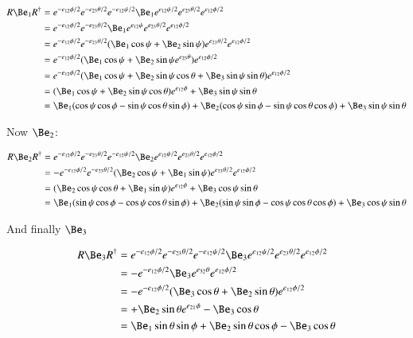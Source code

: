 \documentclass{article}      %
\begin{document}
\begin{align*}
R \Be_1 R^\dagger
&= 
e^{-e_{12}\phi/2} e^{-e_{23}\theta/2} e^{-e_{12}\psi/2}
\Be_1
e^{e_{12}\psi/2}
e^{e_{23}\theta/2} 
e^{e_{12}\phi/2} \\
&= 
e^{-e_{12}\phi/2} e^{-e_{23}\theta/2} 
\Be_1 e^{e_{12}\psi}
e^{e_{23}\theta/2} 
e^{e_{12}\phi/2} \\
&= 
e^{-e_{12}\phi/2} e^{-e_{23}\theta/2} 
(\Be_1 \cos\psi + \Be_2 \sin\psi)
e^{e_{23}\theta/2} 
e^{e_{12}\phi/2} \\
&= 
e^{-e_{12}\phi/2} 
(\Be_1 \cos\psi + \Be_2 \sin\psi e^{e_{23}\theta} )
e^{e_{12}\phi/2} \\
&= 
e^{-e_{12}\phi/2} 
(\Be_1 \cos\psi + \Be_2 \sin\psi \cos\theta + \Be_3 \sin\psi \sin\theta )
e^{e_{12}\phi/2} \\
&= 
(\Be_1 \cos\psi + \Be_2 \sin\psi \cos\theta ) e^{e_{12}\phi} 
+ \Be_3 \sin\psi \sin\theta  \\
&= 
  \Be_1 (\cos\psi \cos\phi - \sin\psi \cos\theta \sin\phi)
+ \Be_2 (\cos\psi \sin\phi - \sin\psi \cos\theta \cos\phi)
+ \Be_3 \sin\psi \sin\theta  \\
\end{align*}

Now $\Be_2$:

\begin{align*}
R \Be_2 R^\dagger
&= 
e^{-e_{12}\phi/2} e^{-e_{23}\theta/2} e^{-e_{12}\psi/2}
\Be_2
e^{e_{12}\psi/2}
e^{e_{23}\theta/2} 
e^{e_{12}\phi/2} \\
&= 
-e^{-e_{12}\phi/2} e^{-e_{23}\theta/2} 
(\Be_2 \cos\psi + \Be_1 \sin\psi)
e^{e_{23}\theta/2} 
e^{e_{12}\phi/2} \\
&= 
(\Be_2 \cos\psi \cos\theta
+ \Be_1 \sin\psi)
e^{e_{12}\phi} 
+\Be_3 \cos\psi \sin\theta \\
&= 
  \Be_1 (\sin\psi \cos\phi - \cos\psi \cos\theta \sin\phi)
+ \Be_2 (\sin\psi \sin\phi - \cos\psi \cos\theta \cos\phi)
+ \Be_3 \cos\psi \sin\theta \\
\end{align*}

And finally $\Be_3$

\begin{align*}
R \Be_3 R^\dagger
&= 
e^{-e_{12}\phi/2} e^{-e_{23}\theta/2} e^{-e_{12}\psi/2}
\Be_3
e^{e_{12}\psi/2}
e^{e_{23}\theta/2} 
e^{e_{12}\phi/2} \\
&= 
-e^{-e_{12}\phi/2} 
\Be_3 e^{e_{32}\theta} 
e^{e_{12}\phi/2} \\
&= 
-e^{-e_{12}\phi/2} 
(
\Be_3 \cos\theta
+\Be_2 \sin\theta
)
e^{e_{12}\phi/2} \\
&= 
+\Be_2 \sin\theta e^{e_{21}\phi} 
-\Be_3 \cos\theta \\
&= 
 \Be_1 \sin\theta \sin\phi
+\Be_2 \sin\theta \cos\phi
-\Be_3 \cos\theta \\
\end{align*}
\end{document}
